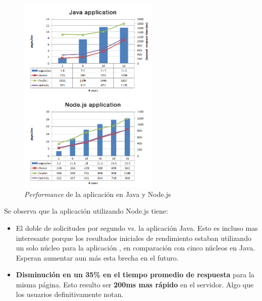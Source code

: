 \begin{figure}[h!]
	\centering
	\includegraphics[width=0.6\textwidth]{figuras/cap2/java_nodejs_benchmark_paypal.png}
	\caption{\textit{Performance} de la aplicación en Java y Node.js}
	\label{figure:java_benchmark_paypal}
\end{figure}

Se observa que la aplicación utilizando Node.js tiene:

\begin{itemize}
\item El doble de solicitudes por segundo vs. la aplicación Java. Esto es incluso mas interesante porque los resultados iniciales de rendimiento estaban utilizando un solo núcleo para la aplicación \nodejs, en comparación con cinco núcleos en Java. Esperan aumentar aun más esta brecha en el futuro.
\item \textbf{Disminución en un 35\% en el tiempo promedio de respuesta} para la misma página. Esto resulto ser \textbf{200ms mas rápido} en el servidor. Algo que los usuarios definitivamente notan.
\end{itemize}

